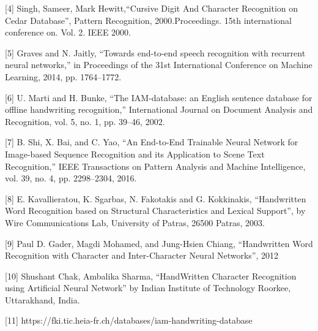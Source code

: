 \documentclass[12pt, conference]{IEEEtran}
\begin{document}
[4] Singh, Sameer, Mark Hewitt,“Cursive Digit And Character Recognition on Cedar Database”, Pattern Recognition, 2000.Proceedings. 15th international conference on. Vol. 2. IEEE 2000.

[5] Graves and N. Jaitly, “Towards end-to-end speech recognition with recurrent neural networks,” in Proceedings of the 31st International Conference on Machine Learning, 2014, pp. 1764–1772.

[6]  U. Marti and H. Bunke, “The IAM-database: an English sentence database for offline handwriting recognition,” International Journal on
Document Analysis and Recognition, vol. 5, no. 1, pp. 39–46, 2002.

[7]  B. Shi, X. Bai, and C. Yao, “An End-to-End Trainable Neural Network for Image-based Sequence Recognition and its Application to Scene
Text Recognition,” IEEE Transactions on Pattern Analysis and Machine Intelligence, vol. 39, no. 4, pp. 2298–2304, 2016.

[8]  E. Kavallieratou, K. Sgarbas, N. Fakotakis and G. Kokkinakis, “Handwritten Word Recognition based on Structural Characteristics and Lexical Support”, by Wire Communications Lab, University of Patras, 26500 Patras, 2003.

[9] Paul D. Gader, Magdi Mohamed, and Jung-Hsien Chiang, “Handwritten Word Recognition with Character and Inter-Character Neural Networks”, 2012

[10] Shushant Chak, Ambalika Sharma, “HandWritten Character Recognition using Artificial Neural Network” by Indian Institute of Technology Roorkee, Uttarakhand, India.

[11] https://fki.tic.heia-fr.ch/databases/iam-handwriting-database
\end{document}
